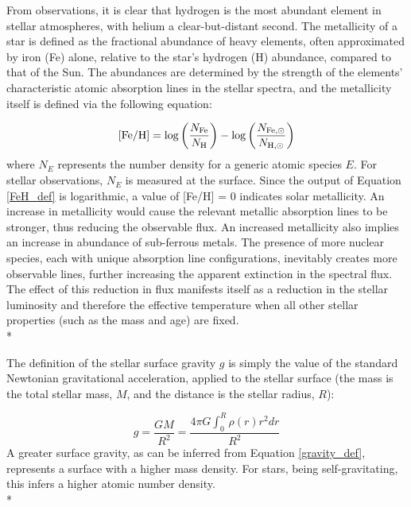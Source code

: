 \documentclass[12pt, a4paper]{report}
\begin{document}
From observations, it is clear that hydrogen is the most abundant element in stellar atmospheres, with helium a clear-but-distant second. The metallicity of a star is defined as the fractional abundance of heavy elements, often approximated by iron (Fe) alone, relative to the star's hydrogen (H) abundance, compared to that of the Sun. The abundances are determined by the strength of the elements' characteristic atomic absorption lines in the stellar spectra, and the metallicity itself is defined via the following equation:

\begin{equation}
\textnormal{[Fe/H]} = \log\left(\frac{N_{\textnormal{Fe}}}{N_{\textnormal{H}}}\right) - \log\left(\frac{N_{\textnormal{Fe},\odot}}{N_{\textnormal{H},\odot}}\right)
\label{FeH_def}
\end{equation}
where $N_{E}$ represents the number density for a generic atomic species $E$. For stellar observations, $N_{E}$ is measured at the surface. Since the output of Equation \ref{FeH_def} is logarithmic, a value of [Fe/H] = 0 indicates solar metallicity. An increase in metallicity would cause the relevant metallic absorption lines to be stronger, thus reducing the observable flux. An increased metallicity also implies an increase in abundance of sub-ferrous metals. The presence of more nuclear species, each with unique absorption line configurations, inevitably creates more observable lines, further increasing the apparent extinction in the spectral flux. The effect of this reduction in flux manifests itself as a reduction in the stellar luminosity and therefore the effective temperature when all other stellar properties (such as the mass and age) are fixed.\\*

The definition of the stellar surface gravity $g$ is simply the value of the standard Newtonian gravitational acceleration, applied to the stellar surface (the mass is the total stellar mass, $M$, and the distance is the stellar radius, $R$):

\begin{equation}
g = \frac{GM}{R^{2}} = \frac{4\pi G\int_{0}^{R}\rho(r)r^{2}dr}{R^{2}}
\label{gravity_def}
\end{equation}
A greater surface gravity, as can be inferred from Equation \ref{gravity_def}, represents a surface with a higher mass density. For stars, being self-gravitating, this infers a higher atomic number density.  \\*

\end{document}
